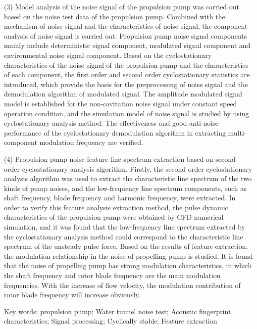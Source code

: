 (3) Model analysis of the noise signal of the propulsion pump was carried out based on the noise test data of the propulsion pump. Combined with the mechanism of noise signal and the characteristics of noise signal, the component analysis of noise signal is carried out. Propulsion pump noise signal components mainly include deterministic signal component, modulated signal component and environmental noise signal component. Based on the cyclostationary characteristics of the noise signal of the propulsion pump and the characteristics of each component, the first order and second order cyclostationary statistics are introduced, which provide the basis for the preprocessing of noise signal and the demodulation algorithm of modulated signal. The amplitude modulated signal model is established for the non-cavitation noise signal under constant speed operation condition, and the simulation model of noise signal is studied by using cyclostationary analysis method. The effectiveness and good anti-noise performance of the cyclostationary demodulation algorithm in extracting multi-component modulation frequency are verified.

(4) Propulsion pump noise feature line spectrum extraction based on second-order cyclostationary analysis algorithm. Firstly, the second order cyclostationary analysis algorithm was used to extract the characteristic line spectrum of the two kinds of pump noises, and the low-frequency line spectrum components, such as shaft frequency, blade frequency and harmonic frequency, were extracted. In order to verify this feature analysis extraction method, the pulse dynamic characteristics of the propulsion pump were obtained by CFD numerical simulation, and it was found that the low-frequency line spectrum extracted by the cyclostationary analysis method could correspond to the characteristic line spectrum of the unsteady pulse force. Based on the results of feature extraction, the modulation relationship in the noise of propelling pump is studied. It is found that the noise of propelling pump has strong modulation characteristics, in which the shaft frequency and rotor blade frequency are the main modulation frequencies. With the increase of flow velocity, the modulation contribution of rotor blade frequency will increase obviously.


\quad

Key words: propulsion pump; Water tunnel noise test; Acoustic fingerprint characteristics; Signal processing; Cyclically stable; Feature extraction